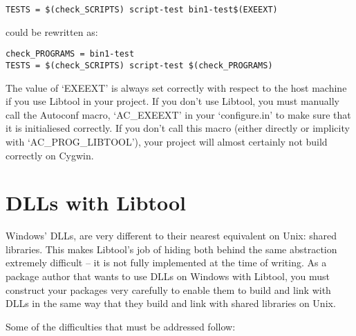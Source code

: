 \begin{Verbatim}[frame=single]
TESTS = $(check_SCRIPTS) script-test bin1-test$(EXEEXT)
\end{Verbatim}

could be rewritten as:

\begin{Verbatim}[frame=single]
check_PROGRAMS = bin1-test
TESTS = $(check_SCRIPTS) script-test $(check_PROGRAMS)
\end{Verbatim}

The value of `EXEEXT' is always set correctly with respect to the host machine if you use Libtool in your project. If you don't use Libtool, you must manually call the Autoconf macro, `AC\_{}EXEEXT' in your `configure.in' to make sure that it is initialiesed correctly. If you don't call this macro (either directly or implicity with `AC\_{}PROG\_{}LIBTOOL'), your project will almost certainly not build correctly on Cygwin.

\section{DLLs with Libtool}

Windows' DLLs, are very different to their nearest equivalent on Unix: shared libraries. This makes Libtool's job of hiding both behind the same abstraction extremely difficult -- it is not fully implemented at the time of writing. As a package author that wants to use DLLs on Windows with Libtool, you must construct your packages very carefully to enable them to build and link with DLLs in the same way that they build and link with shared libraries on Unix.

Some of the difficulties that must be addressed follow: 

